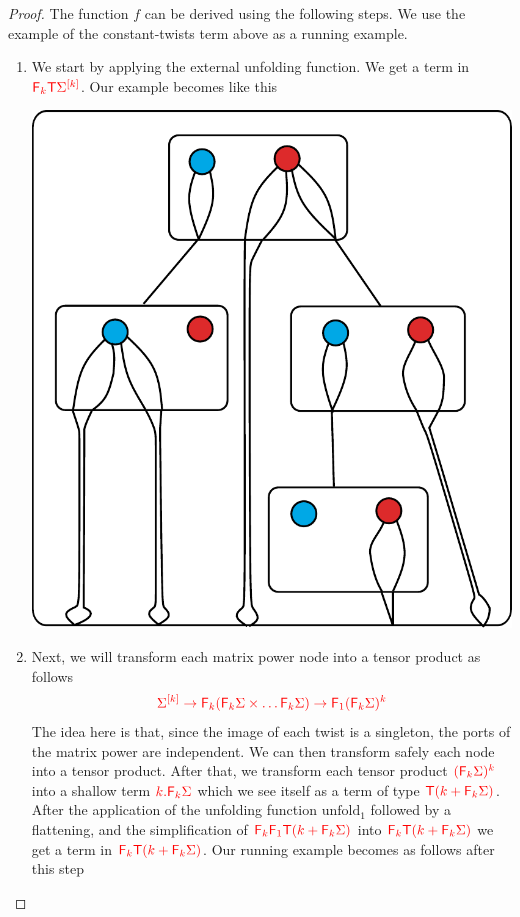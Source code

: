 \begin{proof}
The function $f$ can be derived using the following steps. We use the example of the constant-twists term above as a running example.  
\begin{enumerate}
\item We start by applying the external unfolding function.  We get a term in ${\color{red}{{\color{red}{\mathsf F_{k}}}{\color{red}{\mathsf T}}\Sigma^{[k]}}}$. Our example becomes like this
   \begin{center}
\includegraphics[scale=.35]{pictures/one-unfold1.pdf}
 \end{center}
 \item Next, we will transform each matrix power node into a tensor product as follows 
 \begin{align*}
 {\color{red}{ \Sigma^{[k]} \rightarrow {\color{red}{\mathsf F_{k}}}({\color{red}{\mathsf F_{k}}}\Sigma \times\dots {\color{red}{\mathsf F_{k}}}\Sigma) \to {\color{red}{\mathsf F_{1}}}({\color{red}{\mathsf F_{k}}}\Sigma)^k}}
 \end{align*}
 The idea here is that, since the image of each twist is a singleton,  the ports of the matrix power are independent. We can then transform safely each node into a tensor product. After that, we transform each tensor product ${\color{red}{({\color{red}{\mathsf F_{k}}}\Sigma)^k}}$ into a shallow term ${\color{red}{k.{\color{red}{\mathsf F_{k}}}\Sigma}}$ which we see itself as a term of type ${\color{red}{{\color{red}{\mathsf T}}(k+{\color{red}{\mathsf F_{k}}}\Sigma)}}$. After the application of the unfolding function $\mathrm{unfold}_1$ followed by a flattening, and the simplification of ${\color{red}{{\color{red}{\mathsf F_{k}}}{\color{red}{\mathsf F_{1}}}{\color{red}{\mathsf T}}(k+{\color{red}{\mathsf F_{k}}}\Sigma)}}$ into ${\color{red}{{\color{red}{\mathsf F_{k}}}{\color{red}{\mathsf T}}(k+{\color{red}{\mathsf F_{k}}}\Sigma)}}$ we get a term in ${\color{red}{{\color{red}{\mathsf F_{k}}}{\color{red}{\mathsf T}}(k+{\color{red}{\mathsf F_{k}}}\Sigma)}}$. Our running example becomes as follows after this step

\end{enumerate}
\end{proof}
